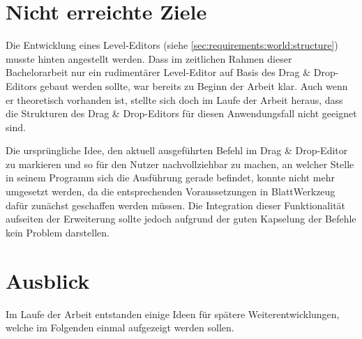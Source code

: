 \section{Nicht erreichte Ziele}
\label{sec:conclusion:open}

Die Entwicklung eines Level-Editors (siehe \ref{sec:requirements:world:structure}) musste hinten angestellt werden. Dass im zeitlichen Rahmen dieser Bachelorarbeit nur ein rudimentärer Level-Editor auf Basis des Drag \& Drop-Editors gebaut werden sollte, war bereits zu Beginn der Arbeit klar. Auch wenn er theoretisch vorhanden ist, stellte sich doch im Laufe der Arbeit heraus, dass die Strukturen des Drag \& Drop-Editors für diesen Anwendungsfall nicht geeignet sind.

Die ursprüngliche Idee, den aktuell ausgeführten Befehl im Drag \& Drop-Editor zu markieren und so für den Nutzer nachvollziehbar zu machen, an welcher Stelle in seinem Programm sich die Ausführung gerade befindet, konnte nicht mehr umgesetzt werden, da die entsprechenden Voraussetzungen in BlattWerkzeug dafür zunächst geschaffen werden müssen. Die Integration dieser Funktionalität aufseiten der Erweiterung sollte jedoch aufgrund der guten Kapselung der Befehle kein Problem darstellen.

\section{Ausblick}
\label{sec:conclusion:future}

Im Laufe der Arbeit entstanden einige Ideen für spätere Weiterentwicklungen, welche im Folgenden einmal aufgezeigt werden sollen.

